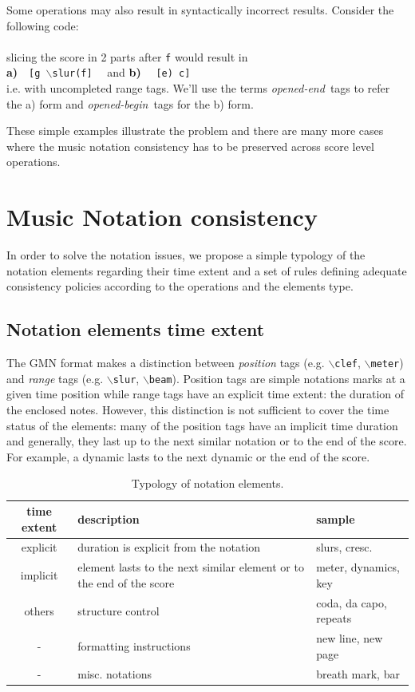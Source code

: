\documentclass[twoside,10pt,a4paper]{article}
\newcommand{\code}[1]		{{\small \texttt{#1}}}
\newcommand{\gtag}[1]		{$\backslash$\code{#1}}
\newcommand{\oend}			{\emph{opened-end}}
\newcommand{\obeg}			{\emph{opened-begin}}
\newcommand{\codeindent}	{\\ \hspace*{9mm}}
\begin{document}
Some operations may also result in syntactically incorrect results. Consider the following code:
\codeindent \code{[g \gtag{slur}(f e) c]} \\
slicing the score in 2 parts after \code{f} would result in 
\codeindent \textbf{a)}\ \ \code{[g \gtag{slur}(f]} \ \  and \textbf{b)} \ \  \code{[e) c]} \\
i.e. with uncompleted range tags. We'll use the terms \oend\ tags to refer the a) form and \obeg\ tags for the b) form.

These simple examples illustrate the problem and there are many more cases where the music notation consistency has to be preserved across score level operations.

\section{Music Notation consistency}

In order to solve the notation issues, we propose a simple typology of the notation elements regarding their time extent and a set of rules defining adequate consistency policies according to the operations and the elements type.

\subsection{Notation elements time extent}

The GMN format makes a distinction between \emph{position} tags (e.g. \gtag{clef}, \gtag{meter}) and \emph{range} tags (e.g. \gtag{slur}, \gtag{beam}). Position tags are simple notations marks at a given time position while range tags have an explicit time extent: the duration of the enclosed notes. 
However, this distinction is not sufficient to cover the time status of the elements: many of the position tags have an implicit time duration and generally, they last up to the next similar notation or to the end of the score. For example, a dynamic lasts to the next dynamic or the end of the score.
\begin{table}[htdp]
\begin{center}
\begin{tabular}{cll}
time extent & description & sample \\
\hline
explicit 	& duration is explicit from the notation	& slurs, cresc. \\
implicit 	& element lasts to the next similar element or to the end of the score		& meter, dynamics, key \\
others 		& structure control			& coda, da capo, repeats\\
	- 		& formatting instructions		& new line, new page \\
	- 		& misc. notations	& breath mark, bar \\
\hline
\end{tabular}
\end{center}
\caption{Typology of notation elements.}
\label{types}
\end{table}
\end{document}
